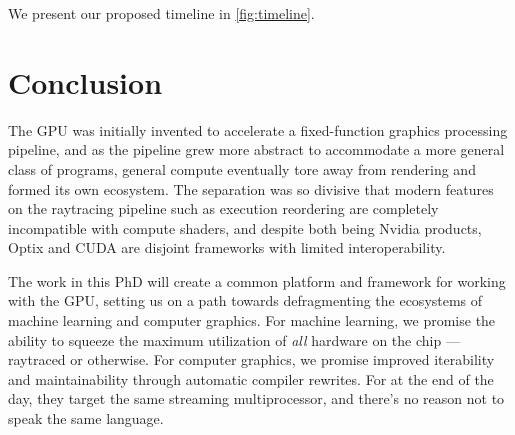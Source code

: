 \documentclass[review, acmsmall, nonacm]{acmart}
\begin{document}
We present our proposed timeline in \autoref{fig:timeline}.


\section{Conclusion}


The GPU was initially invented to accelerate a fixed-function graphics processing pipeline, and as the pipeline grew more abstract to accommodate a more general class of programs, general compute eventually tore away from rendering and formed its own ecosystem. The separation was so divisive that modern features on the raytracing pipeline such as execution reordering \cite{vulkanVulkanised2025Execution2025} are completely incompatible with compute shaders, and despite both being Nvidia products, Optix and CUDA are disjoint frameworks with limited interoperability. 

The work in this PhD will create a common platform and framework for working with the GPU, setting us on a path towards defragmenting the ecosystems of machine learning and computer graphics. For machine learning, we promise the ability to squeeze the maximum utilization of \emph{all} hardware on the chip --- raytraced or otherwise. For computer graphics, we promise improved iterability and maintainability through automatic compiler rewrites. For at the end of the day, they target the same streaming multiprocessor, and there's no reason not to speak the same language.


\end{document}
